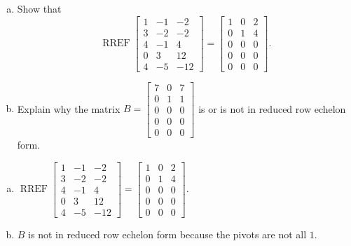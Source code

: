 
\begin{exerciseStatement}

\begin{enumerate}[(a)]
\item Show that \[\operatorname{RREF} \left[\begin{array}{ccc}
1 & -1 & -2 \\
3 & -2 & -2 \\
4 & -1 & 4 \\
0 & 3 & 12 \\
4 & -5 & -12
\end{array}\right] = \left[\begin{array}{ccc}
1 & 0 & 2 \\
0 & 1 & 4 \\
0 & 0 & 0 \\
0 & 0 & 0 \\
0 & 0 & 0
\end{array}\right] .\]
\item Explain why the matrix \(B= \left[\begin{array}{ccc}
7 & 0 & 7 \\
0 & 1 & 1 \\
0 & 0 & 0 \\
0 & 0 & 0 \\
0 & 0 & 0
\end{array}\right] \) is or is not in reduced row echelon form.
\end{enumerate}
    
\end{exerciseStatement}
    
\begin{exerciseAnswer} 

\begin{enumerate}[(a)]
\item \(\operatorname{RREF} \left[\begin{array}{ccc}
1 & -1 & -2 \\
3 & -2 & -2 \\
4 & -1 & 4 \\
0 & 3 & 12 \\
4 & -5 & -12
\end{array}\right] = \left[\begin{array}{ccc}
1 & 0 & 2 \\
0 & 1 & 4 \\
0 & 0 & 0 \\
0 & 0 & 0 \\
0 & 0 & 0
\end{array}\right] .\)
\item \(B\) is not in reduced row echelon form because the pivots are not all \(1\). 
\end{enumerate}
    
\end{exerciseAnswer}
    
